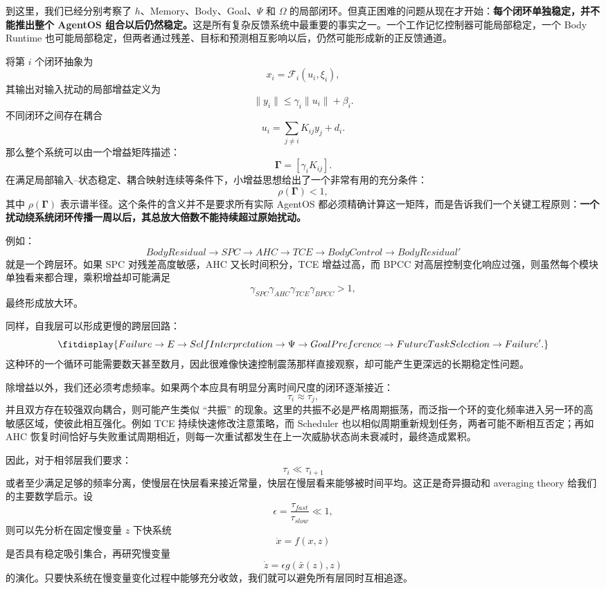 到这里，我们已经分别考察了 $h$、Memory、Body、Goal、$\Psi$ 和 $\Omega$ 的局部闭环。但真正困难的问题从现在才开始：\textbf{每个闭环单独稳定，并不能推出整个 AgentOS 组合以后仍然稳定。}这是所有复杂反馈系统中最重要的事实之一。一个工作记忆控制器可能局部稳定，一个 Body Runtime 也可能局部稳定，但两者通过残差、目标和预测相互影响以后，仍然可能形成新的正反馈通道。

将第 $i$ 个闭环抽象为
\[
x_i
=
\mathcal F_i(u_i,\xi_i),
\]
其输出对输入扰动的局部增益定义为
\[
\|y_i\|
\leq
\gamma_i\|u_i\|
+
\beta_i.
\]
不同闭环之间存在耦合
\[
u_i
=
\sum_{j\neq i}
K_{ij}y_j+d_i.
\]
那么整个系统可以由一个增益矩阵描述：
\[
\mathbf{\Gamma}
=
\left[
\gamma_iK_{ij}
\right].
\]
在满足局部输入--状态稳定、耦合映射连续等条件下，小增益思想给出了一个非常有用的充分条件：
\[
\boxed{
\rho(\mathbf{\Gamma})<1,
}
\]
其中 $\rho(\mathbf{\Gamma})$ 表示谱半径。这个条件的含义并不是要求所有实际 AgentOS 都必须精确计算这一矩阵，而是告诉我们一个关键工程原则：\textbf{一个扰动绕系统闭环传播一周以后，其总放大倍数不能持续超过原始扰动。}

例如：
\[
BodyResidual
\rightarrow
SPC
\rightarrow
AHC
\rightarrow
TCE
\rightarrow
BodyControl
\rightarrow
BodyResidual'
\]
就是一个跨层环。如果 SPC 对残差高度敏感，AHC 又长时间积分，TCE 增益过高，而 BPCC 对高层控制变化响应过强，则虽然每个模块单独看来都合理，乘积增益却可能满足
\[
\gamma_{SPC}
\gamma_{AHC}
\gamma_{TCE}
\gamma_{BPCC}
>1,
\]
最终形成放大环。

同样，自我层可以形成更慢的跨层回路：
\[
\fitdisplay{
Failure
\rightarrow
E
\rightarrow
SelfInterpretation
\rightarrow
\Psi
\rightarrow
GoalPreference
\rightarrow
FutureTaskSelection
\rightarrow
Failure'.
}
\]
这种环的一个循环可能需要数天甚至数月，因此很难像快速控制震荡那样直接观察，却可能产生更深远的长期稳定性问题。

除增益以外，我们还必须考虑频率。如果两个本应具有明显分离时间尺度的闭环逐渐接近：
\[
\tau_i
\approx
\tau_j,
\]
并且双方存在较强双向耦合，则可能产生类似 ``共振'' 的现象。这里的共振不必是严格周期振荡，而泛指一个环的变化频率进入另一环的高敏感区域，使彼此相互强化。例如 TCE 持续快速修改注意策略，而 Scheduler 也以相似周期重新规划任务，两者可能不断相互否定；再如 AHC 恢复时间恰好与失败重试周期相近，则每一次重试都发生在上一次威胁状态尚未衰减时，最终造成累积。

因此，对于相邻层我们要求：
\[
\boxed{
\tau_i
\ll
\tau_{i+1}
}
\]
或者至少满足足够的频率分离，使慢层在快层看来接近常量，快层在慢层看来能够被时间平均。这正是奇异摄动和 averaging theory 给我们的主要数学启示。设
\[
\epsilon
=
\frac{\tau_{fast}}{\tau_{slow}}
\ll1,
\]
则可以先分析在固定慢变量 $z$ 下快系统
\[
\dot x
=
f(x,z)
\]
是否具有稳定吸引集合，再研究慢变量
\[
\dot z
=
\epsilon g(\bar x(z),z)
\]
的演化。只要快系统在慢变量变化过程中能够充分收敛，我们就可以避免所有层同时互相追逐。

